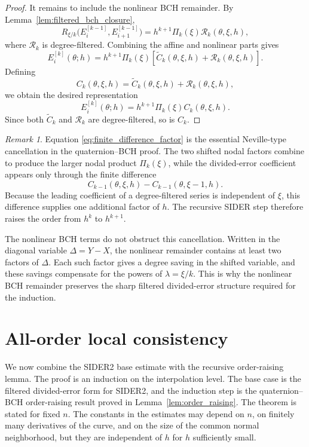 \documentclass[a4paper,11pt]{article}
\numberwithin{equation}{section}
\theoremstyle{plain}
\theoremstyle{definition}
\theoremstyle{remark}
\newtheorem{remark}[thm]{Remark}
\begin{document}
\begin{proof}
It remains to include the nonlinear BCH remainder.  By
Lemma~\ref{lem:filtered_bch_closure},
\[
        R_{\xi/k}
        \bigl(E_i^{[k-1]},E_{i+1}^{[k-1]}\bigr)
        =
        h^{k+1}\Pi_k(\xi)\mathcal R_k(\theta,\xi,h),
\]
where \(\mathcal R_k\) is degree-filtered.  Combining the affine and nonlinear
parts gives
\[
        E_i^{[k]}(\theta;h)
        =
        h^{k+1}\Pi_k(\xi)
        \left[
        \widetilde C_k(\theta,\xi,h)
        +
        \mathcal R_k(\theta,\xi,h)
        \right].
\]
Defining
\[
        C_k(\theta,\xi,h)
        =
        \widetilde C_k(\theta,\xi,h)
        +
        \mathcal R_k(\theta,\xi,h),
\]
we obtain the desired representation
\[
        E_i^{[k]}(\theta;h)
        =
        h^{k+1}\Pi_k(\xi)C_k(\theta,\xi,h).
\]
Since both \(\widetilde C_k\) and \(\mathcal R_k\) are degree-filtered, so is
\(C_k\).
\end{proof}

\begin{remark}
Equation \eqref{eq:finite_difference_factor} is the essential Neville-type
cancellation in the quaternion--BCH proof.  The two shifted nodal factors
combine to produce the larger nodal product \(\Pi_k(\xi)\), while the
divided-error coefficient appears only through the finite difference
\[
        C_{k-1}(\theta,\xi,h)
        -
        C_{k-1}(\theta,\xi-1,h).
\]
Because the leading coefficient of a degree-filtered series is independent of
\(\xi\), this difference supplies one additional factor of \(h\).  The
recursive SIDER step therefore raises the order from \(h^k\) to \(h^{k+1}\).

The nonlinear BCH terms do not obstruct this cancellation.  Written in the
diagonal variable \(\Delta=Y-X\), the nonlinear remainder contains at least two
factors of \(\Delta\).  Each such factor gives a degree saving in the shifted
variable, and these savings compensate for the powers of
\(\lambda=\xi/k\).  This is why the nonlinear BCH remainder preserves the
sharp filtered divided-error structure required for the induction.
\end{remark}

\section{All-order local consistency}
\label{sec:all_order_consistency}

We now combine the SIDER2 base estimate with the recursive order-raising
lemma.  The proof is an induction on the interpolation level.  The base case is
the filtered divided-error form for SIDER2, and the induction step is the
quaternion--BCH order-raising result proved in
Lemma~\ref{lem:order_raising}.  The theorem is stated for fixed \(n\).  The
constants in the estimates may depend on \(n\), on finitely many derivatives
of the curve, and on the size of the common normal neighborhood, but they are
independent of \(h\) for \(h\) sufficiently small.
\end{document}
